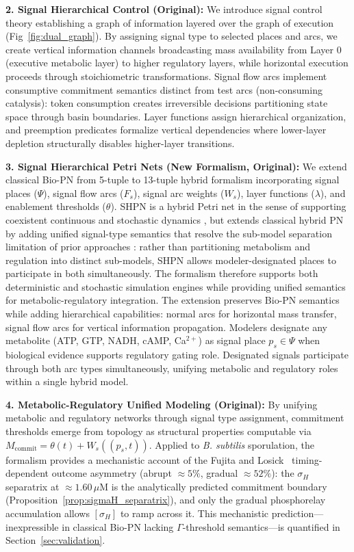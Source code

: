\documentclass[10pt,letterpaper]{article}
\begin{document}
\textbf{2. Signal Hierarchical Control (Original):} We introduce signal control theory establishing a graph of information layered over the graph of execution (Fig~\ref{fig:dual_graph}). By assigning signal type to selected places and arcs, we create vertical information channels broadcasting mass availability from Layer 0 (executive metabolic layer) to higher regulatory layers, while horizontal execution proceeds through stoichiometric transformations. Signal flow arcs implement consumptive commitment semantics distinct from test arcs (non-consuming catalysis): token consumption creates irreversible decisions partitioning state space through basin boundaries. Layer functions assign hierarchical organization, and preemption predicates formalize vertical dependencies where lower-layer depletion structurally disables higher-layer transitions.

\textbf{3. Signal Hierarchical Petri Nets (New Formalism, Original):} We extend classical Bio-PN \cite{reisig1985,koch2011} from 5-tuple to 13-tuple hybrid formalism incorporating signal places ($\Psi$), signal flow arcs ($F_s$), signal arc weights ($W_s$), layer functions ($\lambda$), and enablement thresholds ($\theta$). SHPN is a hybrid Petri net in the sense of supporting coexistent continuous and stochastic dynamics \cite{alla1998,matsuno2003}, but extends classical hybrid PN by adding unified signal-type semantics that resolve the sub-model separation limitation of prior approaches \cite{liu2013}: rather than partitioning metabolism and regulation into distinct sub-models, SHPN allows modeler-designated places to participate in both simultaneously. The formalism therefore supports both deterministic and stochastic simulation engines \cite{goss1998} while providing unified semantics for metabolic-regulatory integration. The extension preserves Bio-PN semantics while adding hierarchical capabilities: normal arcs for horizontal mass transfer, signal flow arcs for vertical information propagation. Modelers designate any metabolite (ATP, GTP, NADH, cAMP, Ca$^{2+}$) as signal place $p_s \in \Psi$ when biological evidence supports regulatory gating role. Designated signals participate through both arc types simultaneously, unifying metabolic and regulatory roles within a single hybrid model.

\textbf{4. Metabolic-Regulatory Unified Modeling (Original):} By unifying metabolic and regulatory networks through signal type assignment, commitment thresholds emerge from topology as structural properties computable via $M_{\text{commit}} = \theta(t) + W_s((p_s,t))$. Applied to \textit{B. subtilis} sporulation, the formalism provides a mechanistic account of the Fujita and Losick~\cite{fujita2005} timing-dependent outcome asymmetry (abrupt $\approx 5\%$, gradual $\approx 52\%$): the $\sigma_H$ separatrix at $\approx 1.60\,\mu$M is the analytically predicted commitment boundary (Proposition~\ref{prop:sigmaH_separatrix}), and only the gradual phosphorelay accumulation allows $[\sigma_H]$ to ramp across it. This mechanistic prediction---inexpressible in classical Bio-PN lacking $\Gamma$-threshold semantics---is quantified in Section~\ref{sec:validation}.
\end{document}
